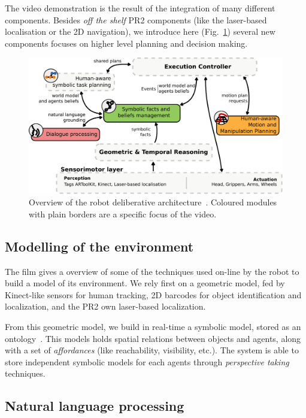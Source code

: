 \documentclass[conference]{IEEEtran}
\begin{document}
The video demonstration is the result of the integration of many different
components. Besides {\it off the shelf} PR2 components (like the laser-based
localisation or the 2D navigation), we introduce here (Fig.~\ref{fig|archi})
several new components focuses on higher level planning and decision making.

\begin{figure}[h!]
        \centering
        \includegraphics[width=\columnwidth]{archi}
        \caption{Overview of the robot deliberative
        architecture~\cite{Alami2011a}. Coloured modules with plain borders are
        a specific focus of the video.}
        \label{fig|archi}
\end{figure}

\subsection{Modelling of the environment}

The film gives a overview of some of the techniques used on-line by the robot
to build a model of its environment. We rely first on a geometric model, fed by
Kinect-like sensors for human tracking, 2D barcodes for object identification
and localization, and the PR2 own laser-based localization.

From this geometric model, we build in real-time a symbolic model, stored as an
ontology~\cite{Lemaignan2010}. This models holds spatial relations between
objects and agents, along with a set of \emph{affordances} (like reachability,
visibility, etc.). The system is able to store independent symbolic models for
each agents through \emph{perspective taking} techniques.

\subsection{Natural language processing}
\end{document}
